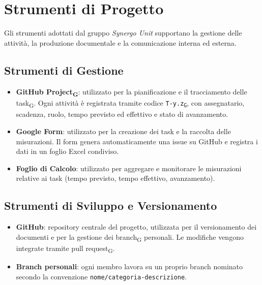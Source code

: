 \section{Strumenti di Progetto}

Gli strumenti adottati dal gruppo \textit{Synergo Unit} supportano la gestione delle attività,
la produzione documentale e la comunicazione interna ed esterna.

\subsection{Strumenti di Gestione}

\begin{itemize}
    \item \textbf{GitHub Project\textsubscript{G}}: utilizzato per la pianificazione e il tracciamento delle task\textsubscript{G}.
    Ogni attività è registrata tramite codice \texttt{T-y.z\textsubscript{G}}, con assegnatario, scadenza,
    ruolo, tempo previsto ed effettivo e stato di avanzamento.

    \item \textbf{Google Form}: utilizzato per la creazione dei task e la raccolta delle misurazioni.
    Il form genera automaticamente una issue su GitHub e registra i dati in un foglio Excel
    condiviso.

    \item \textbf{Foglio di Calcolo}: utilizzato per aggregare e monitorare le misurazioni relative
    ai task (tempo previsto, tempo effettivo, avanzamento).
\end{itemize}

\subsection{Strumenti di Sviluppo e Versionamento}

\begin{itemize}
    \item \textbf{GitHub}: repository centrale del progetto, utilizzata per il versionamento dei
    documenti e per la gestione dei branch\textsubscript{G} personali. Le modifiche vengono integrate
    tramite pull request\textsubscript{G}.

    \item \textbf{Branch personali}: ogni membro lavora su un proprio branch nominato secondo
    la convenzione \texttt{nome/categoria-descrizione}.
\end{itemize}

